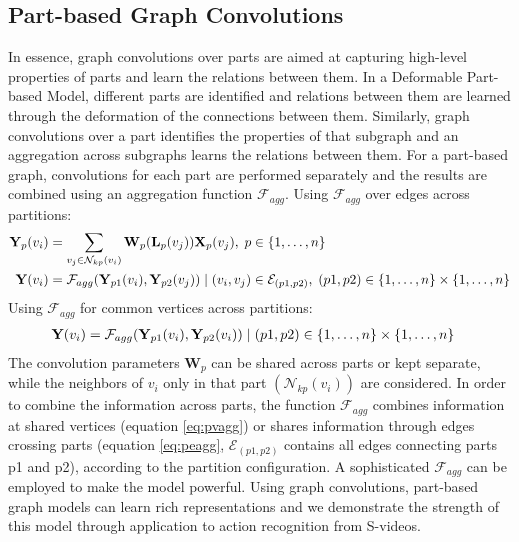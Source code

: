 \documentclass{bmvc2k}
\begin{document}
\subsection{Part-based Graph Convolutions}
\label{sec:3_2}
In essence, graph convolutions over parts are aimed at capturing high-level properties of parts and learn the relations between them. In a Deformable Part-based Model, different parts are identified and relations between them are learned through the deformation of the connections between them. Similarly, graph convolutions over a part identifies the properties of that subgraph and an aggregation across subgraphs learns the relations between them. For a part-based graph, convolutions for each part are performed separately and the results are combined using an aggregation function $\mathcal{F}_{agg}$. Using $\mathcal{F}_{agg}$ over edges across partitions:
\begingroup
\small
\begin{align}
    \mathbf{Y}_p(v_i) &= \sum_{v_j \in \mathcal{N}_{kp}(v_i)} \mathbf{W}_p(\mathbf{L}_p(v_j)) \mathbf{X}_p(v_j), \hspace{0.1cm} p \in \{1,\ldots,n\} \label{eq:pconv}\\
    \mathbf{Y}(v_i) &= \mathcal{F}_{agg}(\mathbf{Y}_{p1}(v_i), \mathbf{Y}_{p2}(v_j)) \hspace{0.1cm} | \hspace{0.1cm} (v_i, v_j) \in \mathcal{E}_{(p1, p2)}, \hspace{0.1cm} (p1, p2) \in \{1,\ldots,n\} \times \{1,\ldots,n\} \label{eq:peagg}
\end{align}
\endgroup
Using $\mathcal{F}_{agg}$ for common vertices across partitions:
\begingroup
\small
\begin{align}
    \mathbf{Y}(v_i) &= \mathcal{F}_{agg}(\mathbf{Y}_{p1}(v_i), \mathbf{Y}_{p2}(v_i)) \hspace{0.1cm} | \hspace{0.1cm} (p1, p2) \in \{1,\ldots,n\} \times \{1,\ldots,n\} \label{eq:pvagg}
\end{align}
\endgroup
The convolution parameters $\mathbf{W}_p$ can be shared across parts or kept separate, while the neighbors of $v_i$ only in that part $(\mathcal{N}_{kp}(v_i))$ are considered. In order to combine the information across parts, the function $\mathcal{F}_{agg}$ combines information at shared vertices (equation \ref{eq:pvagg}) or shares information through edges crossing parts (equation \ref{eq:peagg}, $\mathcal{E}_{(p1,p2)}$ contains all edges connecting parts p1 and p2), according to the partition configuration. A sophisticated $\mathcal{F}_{agg}$ can be employed to make the model powerful. Using graph convolutions, part-based graph models can learn rich representations and we demonstrate the strength of this model through application to action recognition from S-videos.
\end{document}
